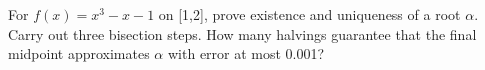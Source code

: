 \documentclass[11pt]{article}
\begin{document}
For \(f(x)=x^{3}-x-1\) on [1,2], prove existence and uniqueness of a root \(\alpha \). Carry out three bisection steps. How many halvings guarantee that the final midpoint approximates \(\alpha \) with error at most 0.001?\par
\vspace{5pt}
\end{document}
